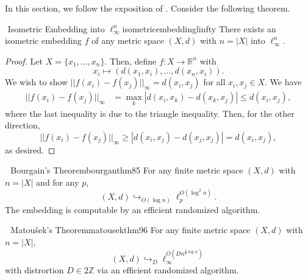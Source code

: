         In this section, we follow the exposition of \cite{}. Consider the following theorem.
        \begin{theorem}{\Stop\,\,Isometric Embedding into \(\ell_\infty^n\)}{isometricembeddinglinfty}
            There exists an isometric embedding \(f\) of any metric space \((X,d)\) with \(n=|X|\) into \(\ell_\infty^n\).
            \begin{proof}
                Let \(X=\{x_1,\ldots,x_n\}\). Then, define \(f:X\to\mathbb{R}^n\) with
                \begin{equation*}
                    x_i\mapsto (d(x_1,x_i),\ldots,d(x_n,x_i)).
                \end{equation*}
                We wish to show \(||f(x_i)-f(x_j)||_\infty=d(x_i,x_j)\) for all \(x_i,x_j\in X\). We have
                \begin{align*}
                    ||f(x_i)-f(x_j)||_\infty&=\max_k|d(x_i,x_k)-d(x_k,x_j)|\leq d(x_i,x_j),
                \end{align*}
                where the last inequality is due to the triangle inequality. Then, for the other direction,
                \begin{equation*}
                    ||f(x_i)-f(x_j)||_\infty\geq |d(x_i,x_j)-d(x_j,x_j)|=d(x_i,x_j),
                \end{equation*}
                as desired.
            \end{proof}
        \end{theorem}
        \begin{theorem}{\Stop\,\,\cite{bourgain1985lipschitz} Bourgain's Theorem}{bourganthm85}
            For any finite metric space \((X,d)\) with \(n=|X|\) and for any \(p\),
            \begin{equation*}
                (X,d)\hookrightarrow_{O(\log n)}\ell_p^{O(\log^2n)}.
            \end{equation*}
            The embedding is computable by an efficient randomized algorithm.
        \end{theorem}
        \begin{theorem}{\Stop\,\,\cite{matousek1996distortion} Matou\v{s}ek's Theorem}{matousekthm96}
            For any finite metric space \((X,d)\) with \(n=|X|\),
            \begin{equation*}
                (X,d)\hookrightarrow_D \ell_\infty^{O(Dn^{\frac{2}{d}\log n})}
            \end{equation*}
            with distrortion \(D\in 2\mathbb{Z}\) via an efficient randomized algorithm.
        \end{theorem}
